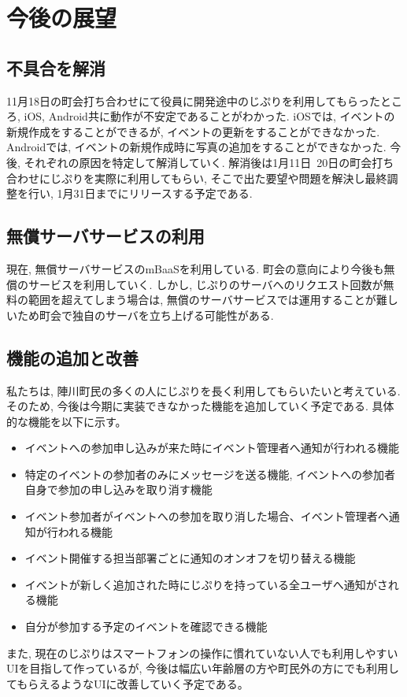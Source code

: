 \chapter{今後の展望}

\section{不具合を解消}
11月18日の町会打ち合わせにて役員に開発途中のじぷりを利用してもらったところ, iOS,  Android共に動作が不安定であることがわかった.
iOSでは, イベントの新規作成をすることができるが, イベントの更新をすることができなかった. Androidでは, イベントの新規作成時に写真の追加をすることができなかった.
今後, それぞれの原因を特定して解消していく. 解消後は1月11日~20日の町会打ち合わせにじぷりを実際に利用してもらい, そこで出た要望や問題を解決し最終調整を行い, 1月31日までにリリースする予定である.

\section{無償サーバサービスの利用}
現在, 無償サーバサービスのmBaaSを利用している. 町会の意向により今後も無償のサービスを利用していく. しかし, じぷりのサーバへのリクエスト回数が無料の範囲を超えてしまう場合は,
無償のサーバサービスでは運用することが難しいため町会で独自のサーバを立ち上げる可能性がある.

\section{機能の追加と改善}
私たちは, 陣川町民の多くの人にじぷりを長く利用してもらいたいと考えている. そのため, 今後は今期に実装できなかった機能を追加していく予定である. 具体的な機能を以下に示す。
\begin{itemize}
    \item イベントへの参加申し込みが来た時にイベント管理者へ通知が行われる機能
    \item 特定のイベントの参加者のみにメッセージを送る機能, イベントへの参加者自身で参加の申し込みを取り消す機能
    \item イベント参加者がイベントへの参加を取り消した場合、イベント管理者へ通知が行われる機能
    \item イベント開催する担当部署ごとに通知のオンオフを切り替える機能
    \item イベントが新しく追加された時にじぷりを持っている全ユーザへ通知がされる機能
    \item 自分が参加する予定のイベントを確認できる機能
\end{itemize}
また, 現在のじぷりはスマートフォンの操作に慣れていない人でも利用しやすいUIを目指して作っているが,
今後は幅広い年齢層の方や町民外の方にでも利用してもらえるようなUIに改善していく予定である。
